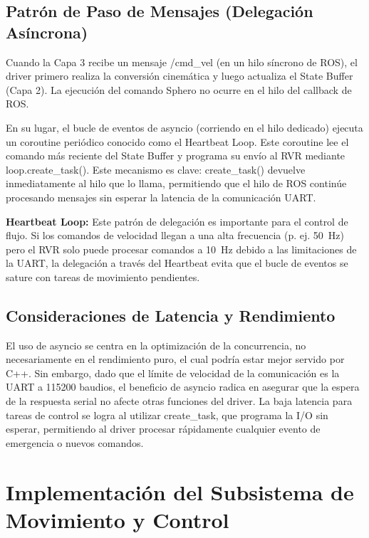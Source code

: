 \documentclass[11pt]{article}
\newcommand{\code}[1]{\textcolor{codeblue}{\url{#1}}}
\numberwithin{figure}{section}
\numberwithin{table}{section}
\def\code#1{#1}%
\begin{document}
\subsection{Patrón de Paso de Mensajes (Delegación Asíncrona)}

Cuando la Capa 3 recibe un mensaje \code{/cmd\_vel} (en un hilo síncrono de ROS), el driver primero realiza la conversión cinemática y luego actualiza el State Buffer (Capa 2). La ejecución del comando Sphero no ocurre en el hilo del callback de ROS.

En su lugar, el bucle de eventos de asyncio (corriendo en el hilo dedicado) ejecuta un coroutine periódico conocido como el Heartbeat Loop. Este coroutine lee el comando más reciente del State Buffer y programa su envío al RVR mediante \code{loop.create\_task()}. Este mecanismo es clave: \code{create\_task()} devuelve inmediatamente al hilo que lo llama, permitiendo que el hilo de ROS continúe procesando mensajes sin esperar la latencia de la comunicación UART.

\begin{tipbox}
\textbf{Heartbeat Loop:} Este patrón de delegación es importante para el control de flujo. Si los comandos de velocidad llegan a una alta frecuencia (p. ej. 50~Hz) pero el RVR solo puede procesar comandos a 10~Hz debido a las limitaciones de la UART, la delegación a través del Heartbeat evita que el bucle de eventos se sature con tareas de movimiento pendientes.
\end{tipbox}


\subsection{Consideraciones de Latencia y Rendimiento}

El uso de asyncio se centra en la optimización de la concurrencia, no necesariamente en el rendimiento puro, el cual podría estar mejor servido por C++. Sin embargo, dado que el límite de velocidad de la comunicación es la UART a 115200 baudios, el beneficio de asyncio radica en asegurar que la espera de la respuesta serial no afecte otras funciones del driver. La baja latencia para tareas de control se logra al utilizar \code{create\_task}, que programa la I/O sin esperar, permitiendo al driver procesar rápidamente cualquier evento de emergencia o nuevos comandos.


\newpage


\section{Implementación del Subsistema de Movimiento y Control}
\end{document}
